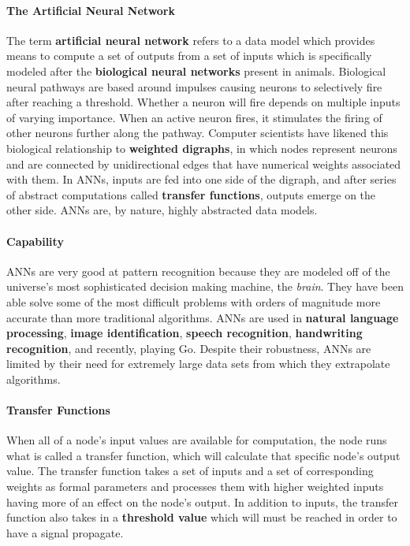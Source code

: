 \documentclass[letterpaper, 10pt]{article}
\begin{document}
	\paragraph{The Artificial Neural Network}
		 The term \textbf{artificial neural network} refers to a data model which provides means to compute a set of outputs from a set of inputs which is specifically modeled after the \textbf{biological neural networks} present in animals. Biological neural pathways are based around impulses causing neurons to selectively fire after reaching a threshold. Whether a neuron will fire depends on multiple inputs of varying importance. When an active neuron fires, it stimulates the firing of other neurons further along the pathway. Computer scientists have likened this biological relationship to \textbf{weighted digraphs}, in which nodes represent neurons and are connected by unidirectional edges that have numerical weights associated with them. In ANNs, inputs are fed into one side of the digraph, and after series of abstract computations called \textbf{transfer functions}, outputs emerge on the other side. ANNs are, by nature, highly abstracted data models.
	\paragraph{Capability}
	ANNs are very good at pattern recognition because they are modeled off of the universe's most sophisticated decision making machine, the \emph{brain}. They have been able solve some of the most difficult problems with orders of magnitude more accurate than more traditional algorithms. ANNs are used in \textbf{natural language processing}, \textbf{image identification}, \textbf{speech recognition}, \textbf{handwriting recognition}, and recently, playing Go. Despite their robustness, ANNs are limited by their need for extremely large data sets from which they extrapolate algorithms.
	\paragraph{Transfer Functions}
	When all of a node's input values are available for computation, the node runs what is called a transfer function, which will calculate that specific node's output value. The transfer function takes a set of inputs and a set of corresponding weights as formal parameters and processes them with higher weighted inputs having more of an effect on the node's output. In addition to inputs, the transfer function also takes in a \textbf{threshold value} which will must be reached in order to have a signal propagate.
\end{document}
